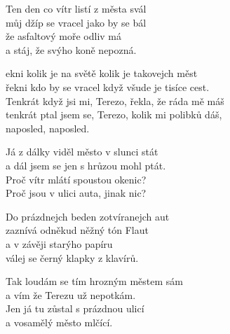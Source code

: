 
\ve{}
Ten den co vítr listí z města svál\\
můj džíp se vracel jako by se bál\\
že asfaltový moře odliv má\\
a stáj, že svýho koně nepozná.

\cho{}
ekni kolik je na světě kolik je takovejch měst\\
řekni kdo by se vracel když všude je tisíce cest.\\
Tenkrát když jsi mi, Terezo, řekla, že ráda mě máš\\
tenkrát ptal jsem se, Terezo, kolik mi polibků dáš,\\
naposled, naposled.

\ve{}
Já z dálky viděl město v slunci stát\\
a dál jsem se jen s hrůzou mohl ptát.\\
Proč vítr mlátí spoustou okenic?\\
Proč jsou v ulici auta, jinak nic?

\cho{}

\ve{}
Do prázdnejch beden zotvíranejch aut\\
zaznívá odněkud něžný tón Flaut\\
a v závěji starýho papíru\\
válej se černý klapky z klavírů.

\cho{}

\ve{}
Tak loudám se tím hrozným městem sám\\
a vím že Terezu už nepotkám.\\
Jen já tu zůstal s prázdnou ulicí\\
a vosamělý město mlčící.

\cho{}

\esong